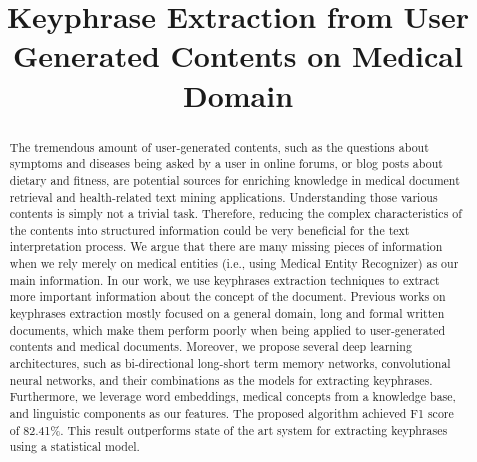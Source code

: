 \documentclass[sigconf]{acmart}
\begin{document}
\title{Keyphrase Extraction from User Generated Contents on Medical Domain}
\iffalse
\titlenote{Produces the permission block, and
  copyright information}
\subtitle{Extended Abstract}
\subtitlenote{The full version of the author's guide is available as
  \texttt{acmart.pdf} document}
\fi



\begin{abstract}
The tremendous amount of user-generated contents, such as the questions about symptoms and diseases being asked by a user in online forums, or blog posts about dietary and fitness, are potential sources for enriching knowledge in medical document retrieval and health-related text mining applications. Understanding those various contents is simply not a trivial task. Therefore, reducing the complex characteristics of the contents into structured information could be very beneficial for the text interpretation process. We argue that there are many missing pieces of information when we rely merely on medical entities (i.e., using Medical Entity Recognizer) as our main information. In our work, we use keyphrases extraction techniques to extract more important information about the concept of the document. Previous works on keyphrases extraction mostly focused on a general domain, long and formal written documents, which make them perform poorly when being applied to user-generated contents and medical documents. Moreover, we propose several deep learning architectures, such as bi-directional long-short term memory networks, convolutional neural networks, and their combinations as the models for extracting keyphrases. Furthermore, we leverage word embeddings, medical concepts from a knowledge base, and linguistic components as our features. The proposed algorithm achieved F1 score of 82.41\%. This result outperforms state of the art system for extracting keyphrases using a statistical model.
\end{abstract}

%
%




\maketitle
\end{document}
